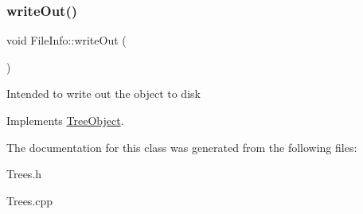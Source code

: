\subsubsection{\texorpdfstring{write\+Out()}{writeOut()}}
{\footnotesize\ttfamily void File\+Info\+::write\+Out (\begin{DoxyParamCaption}{ }\end{DoxyParamCaption})\hspace{0.3cm}{\ttfamily [virtual]}}

Intended to write out the object to disk 

Implements \mbox{\hyperlink{classTreeObject_abf2bf88337bec961784b5dfeb9b795ed}{Tree\+Object}}.



The documentation for this class was generated from the following files\+:\begin{DoxyCompactItemize}
\item 
Trees.\+h\item 
Trees.\+cpp\end{DoxyCompactItemize}
